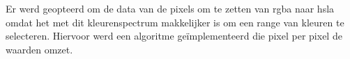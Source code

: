 Er werd geopteerd om de data van de pixels om te zetten van rgba naar hsla omdat het met dit kleurenspectrum makkelijker is om een range van kleuren te selecteren.
Hiervoor werd een algoritme geïmplementeerd die pixel per pixel de waarden omzet. 